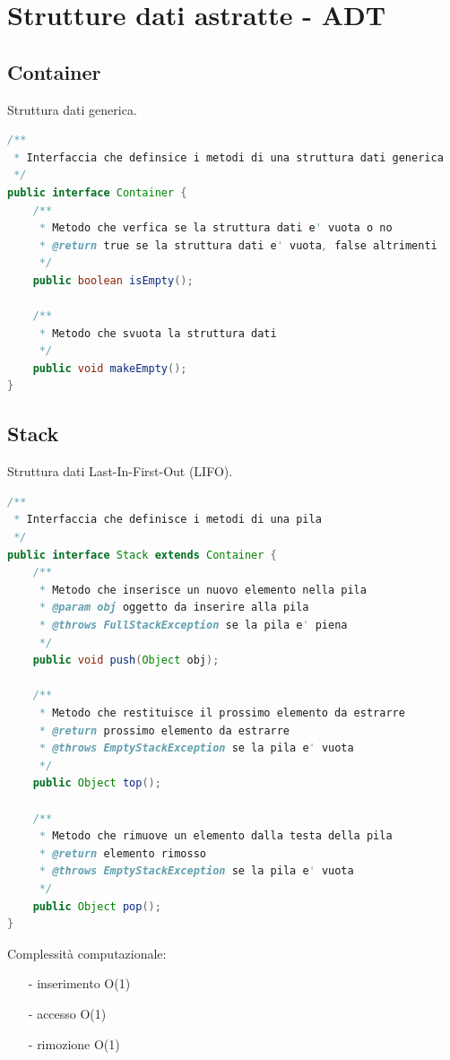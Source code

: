\documentclass{article}
\begin{document}
\section{Strutture dati astratte - ADT}
\subsection{Container}
Struttura dati generica.
\begin{lstlisting}[language=Java]
/**
 * Interfaccia che definsice i metodi di una struttura dati generica
 */
public interface Container {
	/**
	 * Metodo che verfica se la struttura dati e' vuota o no
	 * @return true se la struttura dati e' vuota, false altrimenti
	 */
	public boolean isEmpty();

	/**
	 * Metodo che svuota la struttura dati
	 */
	public void makeEmpty();
}
\end{lstlisting}


\subsection{Stack}
Struttura dati Last-In-First-Out (LIFO).

\begin{lstlisting}[language=Java]
/**
 * Interfaccia che definisce i metodi di una pila
 */
public interface Stack extends Container {
	/**
	 * Metodo che inserisce un nuovo elemento nella pila
	 * @param obj oggetto da inserire alla pila
	 * @throws FullStackException se la pila e' piena
	 */
	public void push(Object obj);

	/**
	 * Metodo che restituisce il prossimo elemento da estrarre
	 * @return prossimo elemento da estrarre
	 * @throws EmptyStackException se la pila e' vuota
	 */
	public Object top();
	
	/**
	 * Metodo che rimuove un elemento dalla testa della pila
	 * @return elemento rimosso
	 * @throws EmptyStackException se la pila e' vuota
	 */
	public Object pop();
}
\end{lstlisting}

Complessità computazionale:
\begin{itemize} [topsep=3pt, itemsep=0pt]
	\item[-] inserimento O(1)
	\item[-] accesso O(1)
	\item[-] rimozione O(1)
\end{itemize}
\end{document}
